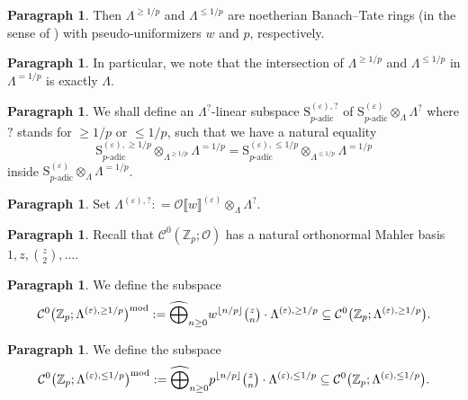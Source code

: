 \documentclass[12pt]{amsart}
\theoremstyle{definition}
\newtheorem{para}[subsection]{Paragraph}
\numberwithin{equation}{subsection}
\def\calC{\mathcal{C}}
\def\calO{\mathcal{O}}
\def\ZZ{\mathbb{Z}}
\def\rmS{\mathrm{S}}
\begin{document}
\begin{para}
\label{P:para_073}
Then $\Lambda^{\geq 1/p}$ and $\Lambda^{\leq 1/p}$ are noetherian Banach--Tate rings (in the sense of \cite[Annexe B]{AIP}) with pseudo-uniformizers $w$ and $p$, respectively.
\end{para}

\begin{para}
\label{P:para_074}
In particular, we note that the intersection of $\Lambda^{\geq 1/p}$ and $\Lambda^{\leq 1/p}$ in $\Lambda^{=1/p}$ is exactly $\Lambda$.
\end{para}

\begin{para}
\label{P:para_075}
We shall define
an $\Lambda^?$-linear subspace $\rmS_{p\textrm{-adic}}^{(\varepsilon), ?}$ of $ \rmS_{p\textrm{-adic}}^{(\varepsilon)} \otimes_{\Lambda} \Lambda^? $ where $?$ stands for $\geq 1/p$ or $\leq 1/p$, such that we have a natural equality
\begin{equation}
\label{E:Mvarepsilon gluing}
\rmS_{p\textrm{-adic}}^{(\varepsilon),\geq 1/p} \otimes_{\Lambda^{\geq 1/p}} \Lambda^{=1/p}  = \rmS_{p\textrm{-adic}}^{(\varepsilon),\leq 1/p} \otimes_{\Lambda^{\leq 1/p}} \Lambda^{=1/p}
\end{equation}
inside $\rmS_{p\textrm{-adic}}^{(\varepsilon)} \otimes_\Lambda \Lambda^{=1/p}$.
\end{para}

\begin{para}
\label{P:para_076}
Set $ \Lambda^{(\varepsilon),?}: = \calO\llbracket w\rrbracket^{(\varepsilon)}\otimes_{\Lambda}\Lambda^?$.
\end{para}

\begin{para}
\label{P:para_077}
Recall that $\calC^0(\ZZ_p; \calO)$ has a natural orthonormal Mahler basis $1, z, \binom z2, \dots$.
\end{para}

\begin{para}
\label{P:para_078}
We define the subspace
\begin{equation}
\label{E:small subspaces}
\calC^0 \big(\ZZ_p;  \Lambda^{(\varepsilon),\geq 1/p}\big)^\mathrm{mod}:= \widehat \bigoplus_{n \geq 0} w^{\lfloor n/p\rfloor} \tbinom zn \cdot \Lambda^{(\varepsilon),\geq 1/p} \subseteq \calC^0\big(\ZZ_p; \Lambda^{(\varepsilon),\geq 1/p}\big).
\end{equation}
\end{para}

\begin{para}
\label{P:para_079}
We define the subspace
\begin{equation}
\label{E:small subspaces2}
\calC^0\big(\ZZ_p; \Lambda^{(\varepsilon),\leq 1/p}\big)^\mathrm{mod}:= \widehat \bigoplus_{n \geq 0} p^{\lfloor n/p\rfloor} \tbinom zn\cdot \Lambda^{(\varepsilon),\leq 1/p} \subseteq \calC^0\big(\ZZ_p; \Lambda^{(\varepsilon),\leq 1/p}\big).
\end{equation}
\end{para}
\end{document}
